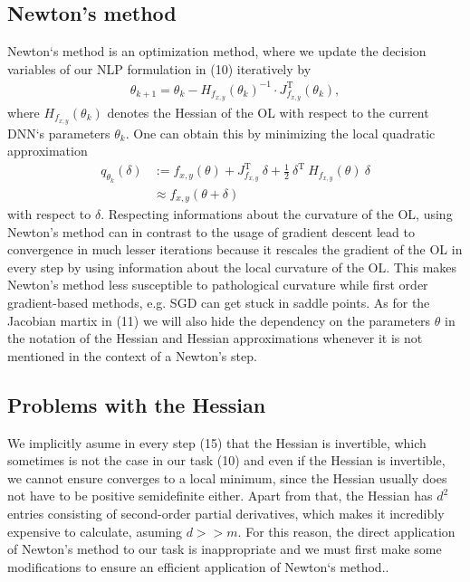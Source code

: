 \documentclass[conference]{IEEEtran}
\begin{document}
\subsection{Newton's method}\label{AA}
Newton`s method is an optimization method, where we update the decision variables of our NLP formulation in (10) iteratively by
\begin{align}
 \theta_{k+1} = \theta_{k} -H_{f_{x, y}}(\theta_{k})^{-1}\cdot J_{f_{x, y}}^{\mathrm{T}}(\theta_{k}),
\end{align}
where $H_{f_{x, y}}(\theta_{k})$ denotes the Hessian of the OL with respect to the current DNN`s parameters $\theta_{k}$. One can obtain this by minimizing the local quadratic approximation
\begin{align}
q_{\theta_{k}}(\delta)&:= f_{x, y}(\theta) + J_{f_{x, y}}^{\mathrm{T}}\:\delta + \frac{1}{2}\:\delta^{\mathrm{T}}\:H_{f_{x, y}}(\theta)\:\delta\\
&\approx f_{x, y}(\theta + \delta)
\end{align}
with respect to $\delta$. 
Respecting informations about the curvature of the OL, using Newton's method can in contrast to the usage of gradient descent lead to convergence in much lesser iterations because it rescales the gradient of the OL in every step by using information about the local curvature of the OL. This makes Newton's method less susceptible to pathological curvature while first order gradient-based methods, e.g. SGD can get stuck in saddle points. As for the Jacobian martix in (11) we will also hide the dependency on the parameters $\theta$ in the notation of the Hessian and Hessian approximations whenever it is not mentioned in the context of a Newton's step.

\subsection{Problems with the Hessian}
We implicitly asume in every step (15) that the Hessian is invertible, which sometimes is not the case in our task (10) and even if the Hessian is invertible, we cannot ensure converges to a local minimum, since the Hessian usually does not have to be positive semidefinite either. Apart from that, the Hessian has $d^{2}$ entries consisting of second-order partial derivatives, which makes it incredibly expensive to calculate, asuming $d>>m$. For this reason, the direct application of Newton's method to our task is inappropriate and we must first make some modifications to ensure an efficient application of Newton`s method..
\end{document}
